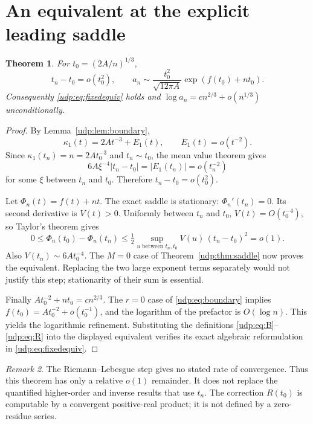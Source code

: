 \documentclass[11pt]{article}
\newtheorem{theorem}{Theorem}[section]
\theoremstyle{remark}\newtheorem{remark}[theorem]{Remark}
\numberwithin{equation}{section}
\begin{document}
\section{An equivalent at the explicit leading saddle}\label{udp:sec:fixed}
\begin{theorem}\label{udp:thm:fixed}
For $t_0=(2A/n)^{1/3}$,
\[
 t_n-t_0=o(t_0^2),\qquad
 a_n\sim\frac{t_0^2}{\sqrt{12\pi A}}\exp(f(t_0)+nt_0).
\]
Consequently \eqref{udp:eq:fixedequiv} holds and $\log a_n=cn^{2/3}+o(n^{1/3})$ unconditionally.
\end{theorem}
\begin{proof}
By Lemma~\ref{udp:lem:boundary},
\[
 \kappa_1(t)=2At^{-3}+E_1(t),\qquad E_1(t)=o(t^{-2}).
\]
Since $\kappa_1(t_n)=n=2At_0^{-3}$ and $t_n\sim t_0$, the mean value theorem gives
\[
 6A\xi^{-4}|t_n-t_0|=|E_1(t_n)|=o(t_n^{-2})
\]
for some $\xi$ between $t_n$ and $t_0$. Therefore $t_n-t_0=o(t_0^2)$.

Let $\Phi_n(t)=f(t)+nt$. The exact saddle is stationary: $\Phi_n'(t_n)=0$. Its second derivative is $V(t)>0$. Uniformly between $t_n$ and $t_0$, $V(t)=O(t_0^{-4})$, so Taylor's theorem gives
\[
 0\le\Phi_n(t_0)-\Phi_n(t_n)
 \le\tfrac12\sup_{u\text{ between }t_n,t_0}V(u)\,(t_n-t_0)^2=o(1).
\]
Also $V(t_n)\sim6At_0^{-4}$. The $M=0$ case of Theorem~\ref{udp:thm:saddle} now proves the equivalent. Replacing the two large exponent terms separately would not justify this step; stationarity of their sum is essential.

Finally $At_0^{-2}+nt_0=cn^{2/3}$. The $r=0$ case of \eqref{udp:eq:boundary} implies $f(t_0)=At_0^{-2}+o(t_0^{-1})$, and the logarithm of the prefactor is $O(\log n)$. This yields the logarithmic refinement. Substituting the definitions \eqref{udp:eq:B}--\eqref{udp:eq:R} into the displayed equivalent verifies its exact algebraic reformulation in \eqref{udp:eq:fixedequiv}.
\end{proof}
\begin{remark}
The Riemann--Lebesgue step gives no stated rate of convergence. Thus this theorem has only a relative $o(1)$ remainder. It does not replace the quantified higher-order and inverse results that use $t_n$. The correction $R(t_0)$ is computable by a convergent positive-real product; it is not defined by a zero-residue series.
\end{remark}
\end{document}
